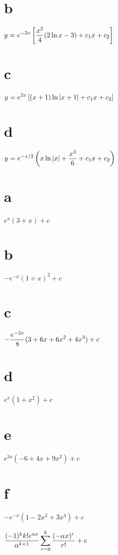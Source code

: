 \part{b} $y=\displaystyle{e^{-3x}\left[\frac{x^{2}}{4}(2\ln
x-3)+c_{1}x+c_{2}\right]}$

\quad\;  \;  \part{c} $y=\displaystyle{e^{2x}\left[(x+1)\ln|x+1|+c_{1}x+c_{2}\right]}$
\part{d} $y=\displaystyle{e^{-x/2}\left(x\ln|x|+\frac{x^{3}}{6}+c_{1}x+c_{2}\right)}$

  \part{a} $e^{x}(3+x)+c$   \part{b} $-e^{-x}(1+x)^{2}+c$
\part{c}  $-\displaystyle{\frac{e^{-2x}}{8}(3+6x+6x^{2}+4x^{3})}+c$

\quad\;  \;  \part{d} $e^{x}(1+x^{2})+c$  \part{e} $e^{3x}(-6+4x+9x^{2})+c$
\part{f} $-e^{-x}(1-2x^{3}+3x^{4})+c$

 $\displaystyle{\frac{(-1)^{k}k!e^{\alpha x}}{\alpha^{k+1}}\sum_{r=0}^{k}\frac{(-\alpha
x)^{r}}{r!}+c}$

